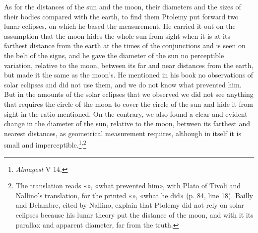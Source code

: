 \documentclass[11pt]{article}
\begin{document}
\par As for the distances of the sun and the moon, their diameters and the sizes of their bodies compared with the earth, to find them Ptolemy put forward two lunar eclipses, on which he based the measurement. He carried it out on the assumption that the moon hides the whole sun from sight when it is at its farthest distance from the earth at the times of the conjunctions and is seen on the belt of the signs, and he gave the diameter of the sun no perceptible variation, relative to the moon, between its far and near distances from the earth, but made it the same as the moon's. He mentioned in his book no observations of solar eclipses and did not use them, and we do not know what prevented him. But in the amounts of the solar eclipses that we observed we did not see anything that requires the circle of the moon to cover the circle of the sun and hide it from sight in the ratio mentioned. On the contrary, we also found a clear and evident change in the diameter of the sun, relative to the moon, between its farthest and nearest distances, as geometrical measurement requires, although in itself it is small and imperceptible.\footnote{\emph{Almagest} V 14.}\textsuperscript{,}\footnote{The translation reads «», «what prevented him», with Plato of Tivoli and Nallino's translation, for the printed «», «what he did» (p. 84, line 18). Bailly and Delambre, cited by Nallino, explain that Ptolemy did not rely on solar eclipses because his lunar theory put the distance of the moon, and with it its parallax and apparent diameter, far from the truth.}\par
\end{document}
